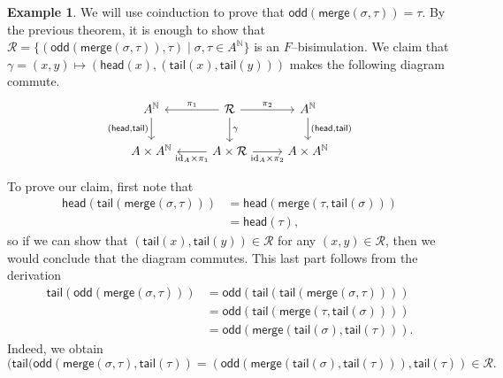 \documentclass{article}
\theoremstyle{definition}
\newtheorem{exmp}[thm]{Example}
\theoremstyle{remark}
\newcommand{\N}{\mathbb{N}}
\newcommand{\tail}{\textsf{tail}}
\newcommand{\sfodd}{\textsf{odd}}
\newcommand{\sfmerge}{\textsf{merge}}
\begin{document}
\begin{exmp}
	We will use coinduction to prove that $\sfodd(\sfmerge(\sigma, \tau)) = \tau$. By the previous theorem, it is enough to show that $\mathcal{R} = \{(\textsf{odd}(\textsf{merge}(\sigma, \tau)), \tau) \mid \sigma, \tau \in A^{\N}\}$ is an $F$--bisimulation. We claim that $\gamma = (x,y) \mapsto (\textsf{head}(x), (\textsf{tail}(x), \textsf{tail}(y)))$ makes the following diagram commute. 
	\begin{equation}\label{diag-mergebisim}
		\centering
		\begin{tikzcd}
			A^{\N} \arrow[d, "{( \textsf{head}, \textsf{tail})}"'] & \mathcal{R} \arrow[l, "\pi_1"'] \arrow[r, "\pi_2"] \arrow[d, "\gamma"] & A^{\N} \arrow[d, "{(\textsf{head}, \textsf{tail})}"] \\
			A\times A^{\N} & A\times \mathcal{R} \arrow[l, "\text{id}_A\times \pi_1"] \arrow[r, "\text{id}_A\times \pi_2"'] & A\times A^{\N}
		\end{tikzcd}
	\end{equation}
	
	To prove our claim, first note that
	\begin{align*}
		 \textsf{head}(\textsf{tail}(\textsf{merge}(\sigma, \tau))) &= \textsf{head}(\textsf{merge}(\tau, \textsf{tail}(\sigma)))\\ &= \textsf{head}(\tau),
	\end{align*}
	so if we can show that $(\textsf{tail}(x), \textsf{tail}(y)) \in \mathcal{R}$ for any $(x,y) \in \mathcal{R}$, then we would conclude that the diagram commutes. This last part follows from the derivation
	\begin{align*}
		\textsf{tail}(\textsf{odd}(\textsf{merge}(\sigma, \tau))) &=
		\sfodd(\tail(\tail(\sfmerge(\sigma,\tau))))\\
		&= \sfodd(\tail(\sfmerge(\tau, \tail(\sigma))))\\
		&= \sfodd(\sfmerge(\tail(\sigma),\tail(\tau))).
    \end{align*}
    Indeed, we obtain 
    \[(\textsf{tail}(\textsf{odd}(\textsf{merge}(\sigma, \tau), \textsf{tail}(\tau)) =(\sfodd(\sfmerge(\tail(\sigma),\tail(\tau))), \textsf{tail}(\tau)) \in \mathcal{R}.\]
\end{exmp}
\end{document}
